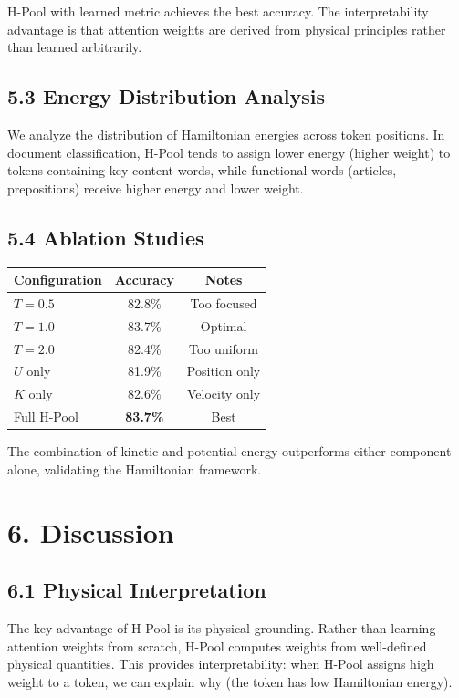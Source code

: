 \documentclass[12pt]{article}
\begin{document}
H-Pool with learned metric achieves the best accuracy. The interpretability advantage is that attention weights are derived from physical principles rather than learned arbitrarily.

\subsection{5.3 Energy Distribution Analysis}

We analyze the distribution of Hamiltonian energies across token positions. In document classification, H-Pool tends to assign lower energy (higher weight) to tokens containing key content words, while functional words (articles, prepositions) receive higher energy and lower weight.

\subsection{5.4 Ablation Studies}

\begin{center}
\begin{tabular}{|l|c|c|}
\hline
\textbf{Configuration} & \textbf{Accuracy} & \textbf{Notes} \\
\hline
$T=0.5$ & 82.8\% & Too focused \\
$T=1.0$ & 83.7\% & Optimal \\
$T=2.0$ & 82.4\% & Too uniform \\
$U$ only & 81.9\% & Position only \\
$K$ only & 82.6\% & Velocity only \\
Full H-Pool & \textbf{83.7\%} & Best \\
\hline
\end{tabular}
\end{center}

The combination of kinetic and potential energy outperforms either component alone, validating the Hamiltonian framework.

\section{6. Discussion}

\subsection{6.1 Physical Interpretation}

The key advantage of H-Pool is its physical grounding. Rather than learning attention weights from scratch, H-Pool computes weights from well-defined physical quantities. This provides interpretability: when H-Pool assigns high weight to a token, we can explain why (the token has low Hamiltonian energy).
\end{document}
